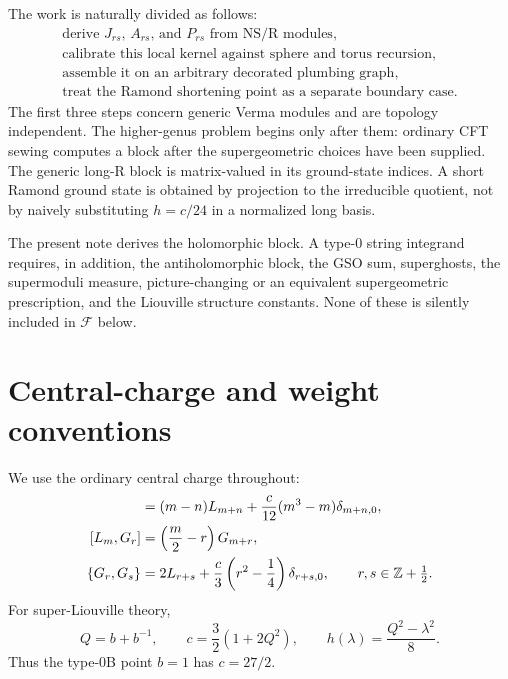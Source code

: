 \documentclass[11pt]{article}
\newcommand{\half}{\tfrac12}
\newcommand{\F}{\mathcal F}
\begin{document}
The work is naturally divided as follows:
\begin{equation}
 \boxed{
 \begin{gathered}
 \text{derive $J_{rs}$, $A_{rs}$, and $P_{rs}$ from NS/R modules},\\
 \text{calibrate this local kernel against sphere and torus recursion},\\
 \text{assemble it on an arbitrary decorated plumbing graph},\\
 \text{treat the Ramond shortening point as a separate boundary case}.
 \end{gathered}}
 \label{eq:route}
\end{equation}
The first three steps concern generic Verma modules and are topology
independent.  The higher-genus problem begins only after them: ordinary CFT
sewing computes a block after the supergeometric choices have been supplied.
The generic long-R block is matrix-valued in its ground-state indices.  A
short Ramond ground state is obtained by projection to the irreducible
quotient, not by naively substituting $h=c/24$ in a normalized long basis.

The present note derives the holomorphic block.  A type-0 string integrand
requires, in addition, the antiholomorphic block, the GSO sum, superghosts,
the supermoduli measure, picture-changing or an equivalent supergeometric
prescription, and the Liouville structure constants.  None of these is
silently included in $\F$ below.

\section{Central-charge and weight conventions}
\label{sec:conventions}

We use the ordinary central charge throughout:
\begin{align}
 [L_m,L_n]
 &= (m-n)L_{m+n}+\frac{c}{12}(m^3-m)\delta_{m+n,0},
 \label{eq:sv-l}\\
 [L_m,G_r]&=\left(\frac m2-r\right)G_{m+r},\notag\\
 \{G_r,G_s\}
 &=2L_{r+s}+\frac c3\left(r^2-\frac14\right)\delta_{r+s,0},
 \qquad r,s\in\mathbb Z+\half .
 \label{eq:sv-g}
\end{align}
For super-Liouville theory,
\begin{equation}
 Q=b+b^{-1},
 \qquad c=\frac32(1+2Q^2),
 \qquad h(\lambda)=\frac{Q^2-\lambda^2}{8}.
 \label{eq:c-h}
\end{equation}
Thus the type-0B point $b=1$ has $c=27/2$.
\end{document}
